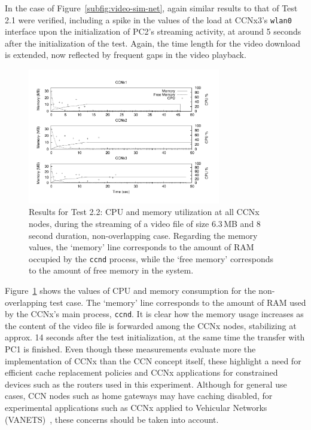 In the case of Figure~\ref{subfig:video-sim-net}, again similar results 
to that of Test 2.1 were verified, including a spike in the values of the load 
at CCNx3's \verb+wlan0+ interface upon the initialization of PC2's streaming 
activity, at around 5 seconds after the initialization of the test. Again, the 
time length for the video download is extended, now reflected by frequent gaps 
in the video playback.\vertbreak

\begin{figure}[h!]

    \centering
    \includegraphics[width=0.75\textwidth]{figures/video-sep-cpu-mem.pdf}
    \cprotect\caption{Results for Test 2.2: CPU and memory utilization at 
        all CCNx nodes, during the streaming of a video file of size 
        6.3\,MB and 8 second duration, non-overlapping case. Regarding the 
        memory values, the `memory' line corresponds to the amount of RAM 
        occupied by the \verb+ccnd+ process, while the `free memory' corresponds 
        to the amount of free memory in the system.}
    \label{fig:video-sep-cpu-mem}

\end{figure}

Figure~\ref{fig:video-sep-cpu-mem} shows the values of CPU and memory 
consumption for the non-overlapping test case. The `memory' line corresponds 
to the amount of RAM used by the CCNx's main process, \verb+ccnd+. It is clear 
how the memory usage increases as the content of the video file is forwarded 
among the CCNx nodes, stabilizing at approx. 14 seconds after the test
 initialization, at the same time the transfer with PC1 is finished. Even though 
these measurements evaluate more the implementation of CCNx than the 
CCN concept itself, these highlight a need for efficient cache 
replacement policies and CCNx applications for constrained devices such as 
the routers used in this experiment. Although for general use cases, CCN nodes 
such as home gateways may have caching disabled, for experimental applications 
such as CCNx applied to Vehicular Networks (VANETS)~\cite{Amadeo2013,Grassi2013}, these 
concerns should be taken into account.


